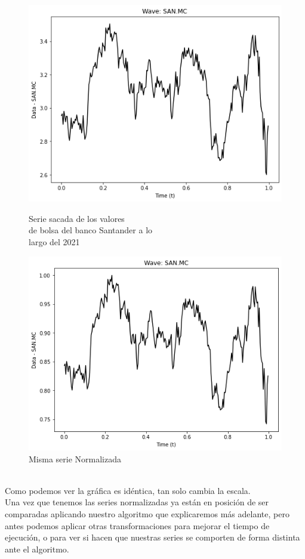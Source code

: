 \documentclass[12pt,a4paper]{article}
\begin{document}
\begin{figure}[H]
\centering
\begin{minipage}{.5\textwidth}
  \centering
  \includegraphics[width=.9\linewidth]{serie}
  \caption{Serie sacada de los valores\\ de bolsa del banco Santander a lo\\ largo del 2021}
  \label{fig:test1}
\end{minipage}%
\begin{minipage}{.5\textwidth}
  \centering
  \includegraphics[width=.9\linewidth]{serie normalizada}
  \caption{Misma serie Normalizada\\ \phantom{filler}\\ \phantom{filler}}
  \label{fig:test2}
\end{minipage}
\end{figure}
		Como podemos ver la gráfica es idéntica, tan solo cambia la escala.\\
		Una vez que tenemos las series normalizadas ya están en posición de ser comparadas aplicando nuestro algoritmo que explicaremos más adelante, pero antes podemos aplicar otras transformaciones para mejorar el tiempo de ejecución, o para ver si hacen que nuestras series se comporten de forma distinta ante el algoritmo.
\end{document}
